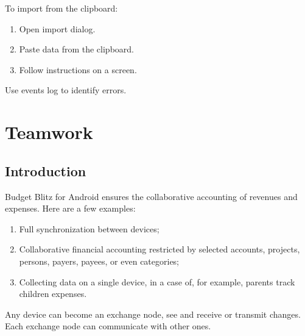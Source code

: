 \documentclass[a4paper,10pt,english]{sphinxmanual}
\begin{document}
\sphinxAtStartPar
To import from the clipboard:
\begin{enumerate}
%
\item {} 
\sphinxAtStartPar
Open import dialog.

\item {} 
\sphinxAtStartPar
Paste data from the clipboard.

\item {} 
\sphinxAtStartPar
Follow instructions on a screen.

\end{enumerate}

\sphinxAtStartPar
Use events log to identify errors.

\sphinxstepscope


\chapter{Teamwork}
\label{\detokenize{teamwork:teamwork}}\label{\detokenize{teamwork:chapter-teamwork}}\label{\detokenize{teamwork::doc}}

\section{Introduction}
\label{\detokenize{teamwork:introduction}}
\sphinxAtStartPar
Budget Blitz for Android ensures the collaborative accounting of revenues and expenses. Here are a few examples:
\begin{enumerate}
%
\item {} 
\sphinxAtStartPar
Full synchronization between devices;

\item {} 
\sphinxAtStartPar
Collaborative financial accounting restricted by selected accounts, projects, persons, payers, payees, or even categories;

\item {} 
\sphinxAtStartPar
Collecting data on a single device, in a case of, for example, parents track children expenses.

\end{enumerate}

\sphinxAtStartPar
Any device can become an exchange node, see {\hyperref[\detokenize{glossary:term-exchange-node}]{}} and receive or transmit changes.
Each exchange node can communicate with other ones.
\end{document}
